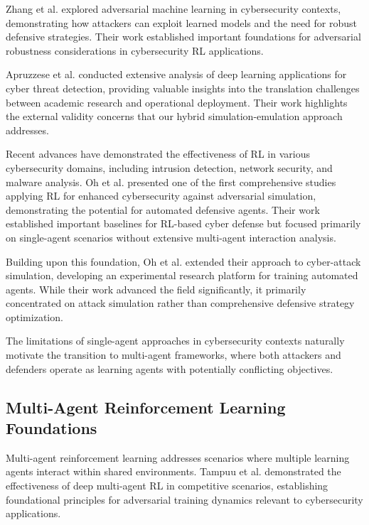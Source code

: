 \documentclass[12pt,oneside]{article}
\begin{document}
Zhang et al. \cite{zhang2020adversarial} explored adversarial machine learning in cybersecurity contexts, demonstrating how attackers can exploit learned models and the need for robust defensive strategies. Their work established important foundations for adversarial robustness considerations in cybersecurity RL applications.

Apruzzese et al. \cite{apruzzese2022deep} conducted extensive analysis of deep learning applications for cyber threat detection, providing valuable insights into the translation challenges between academic research and operational deployment. Their work highlights the external validity concerns that our hybrid simulation-emulation approach addresses.

Recent advances have demonstrated the effectiveness of RL in various cybersecurity domains, including intrusion detection, network security, and malware analysis. Oh et al. \cite{oh2023applying} presented one of the first comprehensive studies applying RL for enhanced cybersecurity against adversarial simulation, demonstrating the potential for automated defensive agents. Their work established important baselines for RL-based cyber defense but focused primarily on single-agent scenarios without extensive multi-agent interaction analysis.

Building upon this foundation, Oh et al. \cite{oh2024employing} extended their approach to cyber-attack simulation, developing an experimental research platform for training automated agents. While their work advanced the field significantly, it primarily concentrated on attack simulation rather than comprehensive defensive strategy optimization.

The limitations of single-agent approaches in cybersecurity contexts naturally motivate the transition to multi-agent frameworks, where both attackers and defenders operate as learning agents with potentially conflicting objectives.

\subsection{Multi-Agent Reinforcement Learning Foundations}

Multi-agent reinforcement learning addresses scenarios where multiple learning agents interact within shared environments. Tampuu et al. \cite{tampuu2017multiagent} demonstrated the effectiveness of deep multi-agent RL in competitive scenarios, establishing foundational principles for adversarial training dynamics relevant to cybersecurity applications.
\end{document}

